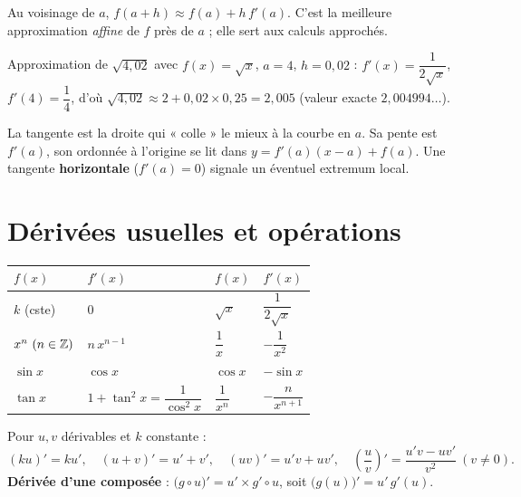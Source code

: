 \begin{propriete}
Au voisinage de $a$, $f(a+h)\approx f(a)+h\,f'(a)$. C'est la meilleure approximation
\emph{affine} de $f$ près de $a$ ; elle sert aux calculs approchés.
\end{propriete}

\begin{exemple}
Approximation de $\sqrt{4{,}02}$ avec $f(x)=\sqrt x$, $a=4$, $h=0{,}02$ :
$f'(x)=\dfrac1{2\sqrt x}$, $f'(4)=\dfrac14$, d'où
$\sqrt{4{,}02}\approx 2+0{,}02\times0{,}25=2{,}005$ (valeur exacte $2{,}004994\ldots$).
\end{exemple}

\begin{aretenir}
La tangente est la droite qui « colle » le mieux à la courbe en $a$. Sa pente est $f'(a)$,
son ordonnée à l'origine se lit dans $y=f'(a)(x-a)+f(a)$. Une tangente \textbf{horizontale}
($f'(a)=0$) signale un éventuel extremum local.
\end{aretenir}

\section{Dérivées usuelles et opérations}

\begin{propriete}
\begin{center}\small
\begin{tabular}{@{}llll@{}}
\toprule
$f(x)$ & $f'(x)$ & $f(x)$ & $f'(x)$\\
\midrule
$k$ (cste) & $0$ & $\sqrt x$ & $\dfrac1{2\sqrt x}$\\[3pt]
$x^{n}\ (n\in\Z)$ & $n\,x^{n-1}$ & $\dfrac1x$ & $-\dfrac1{x^{2}}$\\[3pt]
$\sin x$ & $\cos x$ & $\cos x$ & $-\sin x$\\[3pt]
$\tan x$ & $1+\tan^{2}x=\dfrac1{\cos^{2}x}$ & $\dfrac1{x^{n}}$ & $-\dfrac{n}{x^{n+1}}$\\
\bottomrule
\end{tabular}
\end{center}
\end{propriete}

\begin{propriete}
Pour $u,v$ dérivables et $k$ constante :
\[
(ku)'=ku',\quad (u+v)'=u'+v',\quad (uv)'=u'v+uv',\quad
\left(\frac uv\right)'=\frac{u'v-uv'}{v^{2}}\ (v\ne0).
\]
\textbf{Dérivée d'une composée} : $\big(g\circ u\big)'=u'\times g'\!\circ u$, soit $\big(g(u)\big)'=u'\,g'(u)$.
\end{propriete}

